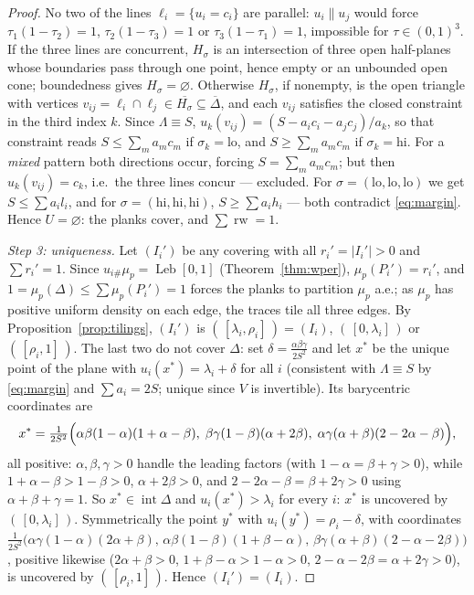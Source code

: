 \documentclass[11pt,reqno]{amsart}
\theoremstyle{plain}
\theoremstyle{definition}
\theoremstyle{remark}
\newcommand{\rw}{\operatorname{rw}}
\newcommand{\Leb}{\operatorname{Leb}}
\begin{document}
\begin{proof}
No two of the lines $\ell_i=\{u_i=c_i\}$ are parallel: $u_i\parallel u_j$ would
force $\tau_1(1-\tau_2)=1$, $\tau_2(1-\tau_3)=1$ or $\tau_3(1-\tau_1)=1$,
impossible for $\tau\in(0,1)^3$. If the three lines are concurrent, $H_\sigma$
is an intersection of three open half-planes whose boundaries pass through one
point, hence empty or an unbounded open cone; boundedness gives
$H_\sigma=\varnothing$. Otherwise $H_\sigma$, if nonempty, is the open triangle
with vertices $v_{ij}=\ell_i\cap\ell_j\in\overline{H_\sigma}
\subseteq\overline\Delta$, and each $v_{ij}$ satisfies the closed constraint in
the third index $k$. Since $\Lambda\equiv S$,
$u_k(v_{ij})=(S-a_ic_i-a_jc_j)/a_k$, so that constraint reads $S\le\sum_ma_mc_m$
if $\sigma_k=\mathrm{lo}$, and $S\ge\sum_ma_mc_m$ if $\sigma_k=\mathrm{hi}$. For
a \emph{mixed} pattern both directions occur, forcing $S=\sum_ma_mc_m$; but then
$u_k(v_{ij})=c_k$, i.e.\ the three lines concur --- excluded. For
$\sigma=(\mathrm{lo},\mathrm{lo},\mathrm{lo})$ we get $S\le\sum a_il_i$, and for
$\sigma=(\mathrm{hi},\mathrm{hi},\mathrm{hi})$, $S\ge\sum a_ih_i$ --- both
contradict \eqref{eq:margin}. Hence $U=\varnothing$: the planks cover, and
$\sum\rw=1$.

\emph{Step 3: uniqueness.} Let $(I_i')$ be any covering with all
$r_i'=|I_i'|>0$ and $\sum r_i'=1$. Since $u_{i\#}\mu_p=\Leb[0,1]$
(Theorem~\ref{thm:wper}), $\mu_p(P_i')=r_i'$, and
$1=\mu_p(\Delta)\le\sum\mu_p(P_i')=1$ forces the planks to partition $\mu_p$
a.e.; as $\mu_p$ has positive uniform density on each edge, the traces tile all
three edges. By Proposition~\ref{prop:tilings}, $(I_i')$ is $(\,[\lambda_i,
\rho_i]\,)=(I_i)$, $(\,[0,\lambda_i]\,)$ or $(\,[\rho_i,1]\,)$. The last two do
not cover $\Delta$: set $\delta=\frac{\alpha\beta\gamma}{2S^2}$ and let
$x^\ast$ be the unique point of the plane with $u_i(x^\ast)=\lambda_i+\delta$
for all $i$ (consistent with $\Lambda\equiv S$ by \eqref{eq:margin} and
$\sum a_i=2S$; unique since $V$ is invertible). Its barycentric coordinates are
\[
x^\ast=\tfrac1{2S^2}\Bigl(\alpha\beta(1-\alpha)(1+\alpha-\beta),\;
\beta\gamma(1-\beta)(\alpha+2\beta),\;
\alpha\gamma(\alpha+\beta)(2-2\alpha-\beta)\Bigr),
\]
all positive: $\alpha,\beta,\gamma>0$ handle the leading factors (with
$1-\alpha=\beta+\gamma>0$), while $1+\alpha-\beta>1-\beta>0$, $\alpha+2\beta>0$,
and $2-2\alpha-\beta=\beta+2\gamma>0$ using $\alpha+\beta+\gamma=1$. So
$x^\ast\in\operatorname{int}\Delta$ and
$u_i(x^\ast)>\lambda_i$ for every $i$: $x^\ast$ is uncovered by
$(\,[0,\lambda_i]\,)$. Symmetrically the point $y^\ast$ with
$u_i(y^\ast)=\rho_i-\delta$, with coordinates
$\frac1{2S^2}\bigl(\alpha\gamma(1-\alpha)(2\alpha+\beta),\,
\alpha\beta(1-\beta)(1+\beta-\alpha),\,
\beta\gamma(\alpha+\beta)(2-\alpha-2\beta)\bigr)$, positive likewise
($2\alpha+\beta>0$, $1+\beta-\alpha>1-\alpha>0$,
$2-\alpha-2\beta=\alpha+2\gamma>0$), is uncovered by
$(\,[\rho_i,1]\,)$. Hence $(I_i')=(I_i)$.
\end{proof}
\end{document}
